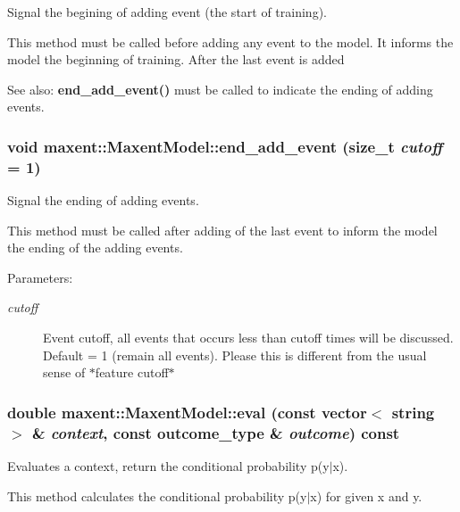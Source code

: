 Signal the begining of adding event (the start of training). 

This method must be called before adding any event to the model. It informs the model the beginning of training. After the last event is added \begin{Desc}
\item[See also:]{\bf end\_\-add\_\-event()} must be called to indicate the ending of adding events. \end{Desc}
\subsubsection{\setlength{\rightskip}{0pt plus 5cm}void maxent::Maxent\-Model::end\_\-add\_\-event (size\_\-t {\em cutoff} = 1)}\label{classmaxent_1_1MaxentModel_a15}


Signal the ending of adding events. 

This method must be called after adding of the last event to inform the model the ending of the adding events.

\begin{Desc}
\item[Parameters:]
\begin{description}
\item[{\em cutoff}]Event cutoff, all events that occurs less than cutoff times will be discussed. Default = 1 (remain all events). Please this is different from the usual sense of $\ast$feature cutoff$\ast$ \end{description}
\end{Desc}
\subsubsection{\setlength{\rightskip}{0pt plus 5cm}double maxent::Maxent\-Model::eval (const vector$<$ string $>$ \& {\em context}, const outcome\_\-type \& {\em outcome}) const}\label{classmaxent_1_1MaxentModel_a11}


Evaluates a context, return the conditional probability p(y$|$x). 

This method calculates the conditional probability p(y$|$x) for given x and y.

